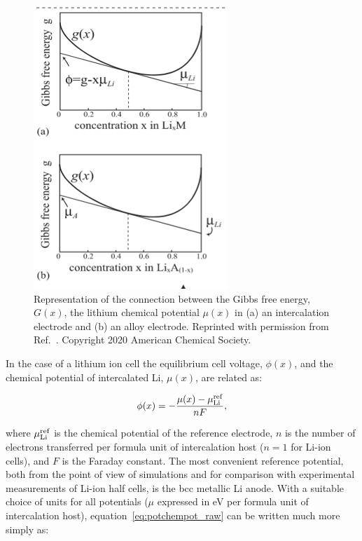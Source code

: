\documentclass[../main.tex]{subfiles}
\begin{document}
\begin{figure}
    \centering
    \includegraphics[scale=2]{figures/thermodynamics_vanderven.png}
    \caption{Representation of the connection between the Gibbs free energy, $G(x)$, the  lithium chemical potential $\mu(x)$ in (a) an intercalation electrode and (b) an alloy electrode. Reprinted with permission from Ref.~. Copyright 2020 American Chemical Society.}
    \label{fig:vanderven_thermodynamics}
\end{figure}

In the case of a lithium ion cell the equilibrium cell voltage, $\phi(x)$, and the chemical potential of intercalated Li, $\mu(x)$, are related as:

\begin{equation}
    \phi(x) = -\frac{\mu(x) - \mu_{\rm{Li}}^{\rm{ref}}}{nF},
    \label{eq:potchempot_raw}
\end{equation}

where $\mu_{\rm{Li}}^{\rm{ref}}$ is the chemical potential of the reference electrode, $n$ is the number of electrons transferred per formula unit of intercalation host ($n =1$ for Li-ion cells), and $F$ is the Faraday constant. The most convenient reference potential, both from the point of view of simulations and for comparison with experimental measurements of Li-ion half cells, is the bcc metallic Li anode. With a suitable choice of units for all potentials ($\mu$ expressed in eV per formula unit of intercalation host), equation~\ref{eq:potchempot_raw} can be written much more simply as: \cite{CEDER1999131}
\end{document}
